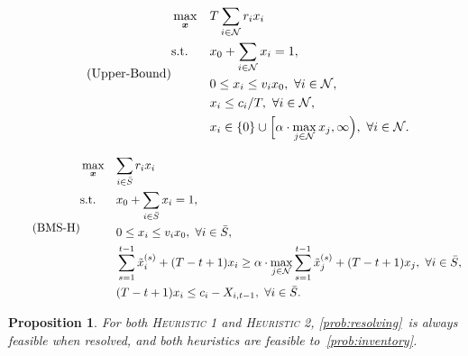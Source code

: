 \documentclass[10pt,a4paper]{amsart}
\newtheorem{proposition}{Proposition}
\begin{document}
\begin{equation}\label{prob:inventory_upper_bound}
\tag{\texttt{Upper-Bound}}
\begin{aligned}
&\max_{\bm{x}}&&{T\sum_{i\in\mathcal{N}}r_ix_i}\\
&\text{s.t.}&&{x_0+\sum_{i\in\mathcal{N}}x_i=1},\\
&&&{0\leq x_i\leq v_ix_0,\ \forall i\in\mathcal{N}},\\
&&&{x_i\leq c_i/T,\ \forall i\in\mathcal{N}},\\
&&&{x_i\in\{0\}\cup\Big[\alpha\cdot\max_{j\in\mathcal{N}}x_j,\infty\Big),\ \forall i\in\mathcal{N}.}
\end{aligned}
\end{equation}

\begin{equation}\label{prob:resolving}
\tag{\texttt{BMS-H}}
\begin{aligned}
&\max_{\bm{x}}&&{\sum_{i\in\bar{S}}r_ix_i}\\
&\text{s.t.}&&{x_0+\sum_{i\in\bar{S}}x_i=1},\\
&&&{0\leq x_i\leq v_ix_0,\ \forall i\in\bar{S}},\\
&&&\sum_{s=1}^{t-1}\tilde{x}_i^{(s)}+(T-t+1)x_i\geq \alpha\cdot\max_{j\in\mathcal{N}}\sum_{s=1}^{t-1}\tilde{x}_j^{(s)}+(T-t+1)x_j,\ \forall i\in\bar{S},\\
&&&{(T-t+1)x_{i}\leq c_i-X_{i,t-1},\ \forall i\in\bar{S}.}
\end{aligned}
\end{equation}

\begin{proposition}\label{prop:heuristic}
For both \textsc{Heuristic 1} and \textsc{Heuristic 2}, \ref{prob:resolving}~is always feasible when resolved, and both heuristics are feasible to~\ref{prob:inventory}.
\end{proposition}
\end{document}
